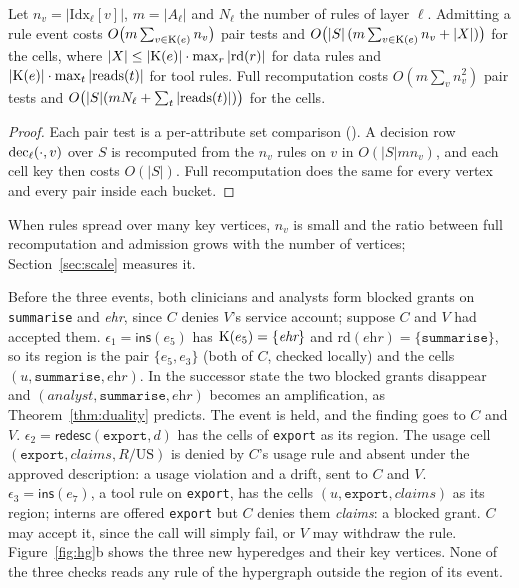 \begin{proposition}[Cost]\label{prop:cost}
Let $n_v = |\mathrm{Idx}_\ell[v]|$, $m = |A_\ell|$ and $N_\ell$ the number of rules of layer $\ell$. Admitting a rule event costs $O\bigl(m \sum_{v \in \mathrm{K}(e)} n_v\bigr)$ pair tests and $O\bigl(|S|\,(m \sum_{v \in \mathrm{K}(e)} n_v + |X|)\bigr)$ for the cells, where $|X| \le |\mathrm{K}(e)| \cdot \max_r |\mathrm{rd}(r)|$ for data rules and $|\mathrm{K}(e)| \cdot \max_t |\mathrm{reads}(t)|$ for tool rules. Full recomputation costs $O(m \sum_v n_v^2)$ pair tests and $O\bigl(|S|(m N_\ell + \sum_t |\mathrm{reads}(t)|)\bigr)$ for the cells.
\end{proposition}
\begin{proof}
Each pair test is a per-attribute set comparison (). A decision row $\mathrm{dec}_\ell(\cdot, v)$ over $S$ is recomputed from the $n_v$ rules on $v$ in $O(|S| m n_v)$, and each cell key then costs $O(|S|)$. Full recomputation does the same for every vertex and every pair inside each bucket.
\end{proof}
When rules spread over many key vertices, $n_v$ is small and the ratio between full recomputation and admission grows with the number of vertices; Section~\ref{sec:scale} measures it.

\begin{example}\label{ex:admission}
Before the three events, both clinicians and analysts form blocked grants on \texttt{summarise} and \textit{ehr}, since $C$ denies $V$'s service account; suppose $C$ and $V$ had accepted them.
\textbf{$\epsilon_1 = \mathsf{ins}(e_5)$} has $\mathrm{K}(e_5) = \{\textit{ehr}\}$ and $\mathrm{rd}(\textit{ehr}) = \{\texttt{summarise}\}$, so its region is the pair $\{e_5, e_3\}$ (both of $C$, checked locally) and the cells $(u, \texttt{summarise}, \textit{ehr})$. In the successor state the two blocked grants disappear and $(\textit{analyst}, \texttt{summarise}, \textit{ehr})$ becomes an amplification, as Theorem~\ref{thm:duality} predicts. The event is held, and the finding goes to $C$ and $V$.
\textbf{$\epsilon_2 = \mathsf{redesc}(\texttt{export}, d)$} has the cells of \texttt{export} as its region. The usage cell $(\texttt{export}, \textit{claims}, R/\mathrm{US})$ is denied by $C$'s usage rule and absent under the approved description: a usage violation and a drift, sent to $C$ and $V$.
\textbf{$\epsilon_3 = \mathsf{ins}(e_7)$}, a tool rule on \texttt{export}, has the cells $(u, \texttt{export}, \textit{claims})$ as its region; interns are offered \texttt{export} but $C$ denies them \textit{claims}: a blocked grant. $C$ may accept it, since the call will simply fail, or $V$ may withdraw the rule.
Figure~\ref{fig:hg}b shows the three new hyperedges and their key vertices. None of the three checks reads any rule of the hypergraph outside the region of its event.
\end{example}
